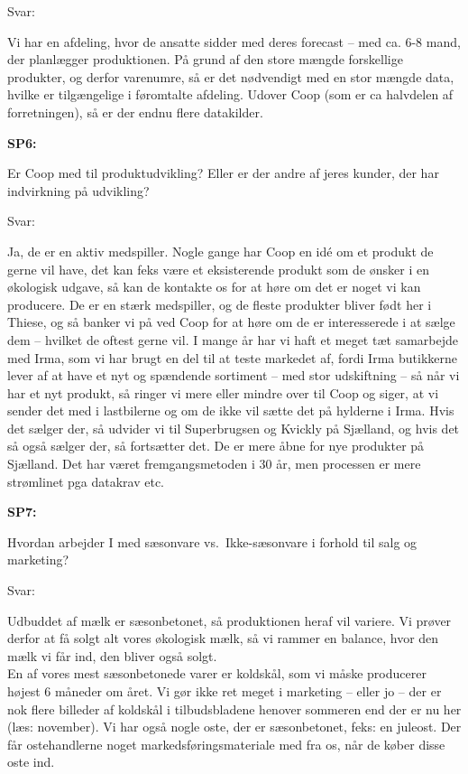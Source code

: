 \documentclass[
  12pt,
  a4paper,
  DIV=11,
  numbers=noendperiod]{scrartcl}
\begin{document}
\begin{itemize}
  Svar:~

  Vi har en afdeling, hvor de ansatte sidder med deres forecast -- med
  ca. 6-8 mand, der planlægger produktionen. På grund af den store
  mængde forskellige produkter, og derfor varenumre, så er det
  nødvendigt med en stor mængde data, hvilke er tilgængelige i
  føromtalte afdeling. Udover Coop (som er ca halvdelen af
  forretningen), så er der endnu flere datakilder.~

  \textbf{SP6:} ~

  Er Coop med til produktudvikling? Eller er der andre af jeres kunder,
  der har indvirkning på udvikling?~

  Svar:~

  Ja, de er en aktiv medspiller. Nogle gange har Coop en idé om et
  produkt de gerne vil have, det kan feks være et eksisterende produkt
  som de ønsker i en økologisk udgave, så kan de kontakte os for at høre
  om det er noget vi kan producere. De er en stærk medspiller, og de
  fleste produkter bliver født her i Thiese, og så banker vi på ved Coop
  for at høre om de er interesserede i at sælge dem -- hvilket de oftest
  gerne vil. I mange år har vi haft et meget tæt samarbejde med Irma,
  som vi har brugt en del til at teste markedet af, fordi Irma
  butikkerne lever af at have et nyt og spændende sortiment -- med stor
  udskiftning -- så når vi har et nyt produkt, så ringer vi mere eller
  mindre over til Coop og siger, at vi sender det med i lastbilerne og
  om de ikke vil sætte det på hylderne i Irma. Hvis det sælger der, så
  udvider vi til Superbrugsen og Kvickly på Sjælland, og hvis det så
  også sælger der, så fortsætter det. De er mere åbne for nye produkter
  på Sjælland. Det har været fremgangsmetoden i 30 år, men processen er
  mere strømlinet pga datakrav etc.~

  \textbf{SP7:}~

  Hvordan arbejder I med sæsonvare vs.~Ikke-sæsonvare i forhold til salg
  og marketing?~

  Svar:~

  Udbuddet af mælk er sæsonbetonet, så produktionen heraf vil variere.
  Vi prøver derfor at få solgt alt vores økologisk mælk, så vi rammer en
  balance, hvor den mælk vi får ind, den bliver også solgt.~\\
  En af vores mest sæsonbetonede varer er koldskål, som vi måske
  producerer højest 6 måneder om året. Vi gør ikke ret meget i marketing
  -- eller jo -- der er nok flere billeder af koldskål i tilbudsbladene
  henover sommeren end der er nu her (læs: november). Vi har også nogle
  oste, der er sæsonbetonet, feks: en juleost. Der får ostehandlerne
  noget markedsføringsmateriale med fra os, når de køber disse oste
  ind.~~


\end{itemize}
\end{document}
